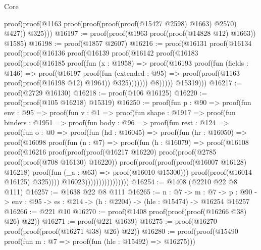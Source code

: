 \begin{lexlean}{Core}
\begin{coremodule}
        proof(proof(@1163 proof(proof(proof(proof(@15427 @2598) @1663) @2570) @427)) @325)))
@16197 := proof(proof(@1963 proof(proof(@14828 @12) @1663)) @1585)
@16198 := proof(@1857 @2607)
@16216 := proof(@16131
      proof(@16134
          proof(proof(@16136
                proof(@16139
                    proof(@16142
                        proof(@16183
                            proof(proof(@16185
                                  proof(fun (x : @1958) =>
                                    proof(@16193
                                        proof(fun (fields : @146) =>
                                          proof(@16197
                                              proof(fun (extended : @95) =>
                                                proof(proof(@1163 proof(proof(@16198 @12) @1964))
                                                    @325)))))))
                                @8)))))
              @15319)))
@16217 := proof(@2729 @16130)
@16218 := proof(@106 @16125)
@16220 := proof(proof(@105 @16218) @15319)
@16250 := proof(fun {p : @90} =>
    proof(fun {env : @95} =>
      proof(fun {v : @1} =>
        proof(fun {shape : @1917} =>
          proof(fun {binders : @1951} =>
            proof(fun {body : @96} =>
              proof(fun {rest : @124} =>
                proof(fun {o : @0} =>
                  proof(fun (hd : @16045) =>
                    proof(fun (hr : @16050) =>
                      proof(@16098
                          proof(fun (n : @7) =>
                            proof(fun (h : @16079) =>
                              proof(@16108
                                  proof(@16216
                                      proof(proof(proof(@16217 @16220)
                                            proof(proof(@2785 proof(proof(@708 @16130) @16220))
                                                proof(proof(proof(proof(@16007 @16128) @16218)
                                                      proof(fun (_a : @63) => proof(@16010 @15300)))
                                                    proof(proof(@16014 @16125) @325))))
                                          @16023))))))))))))))))
@16254 := @1408 (@2210 @22 @8 @111)
@16257 := @1638 @22 @8 @111
@16265 := {n : @7} ->
  {m : @7} ->
  {p : @90} -> {env : @95} -> {es : @214} -> (h : @2204) -> (hle : @15474) -> @16254 @16257
@16266 := @221 @10
@16270 := proof(@1408 proof(proof(proof(@16266 @38) @26) @22))
@16271 := proof(@221 @1639)
@16275 := proof(@16270 proof(proof(proof(@16271 @38) @26) @22))
@16280 := proof(proof(@15490 proof(fun {m : @7} => proof(fun (hle : @15492) => @16275)))

\end{coremodule}
\end{lexlean}
